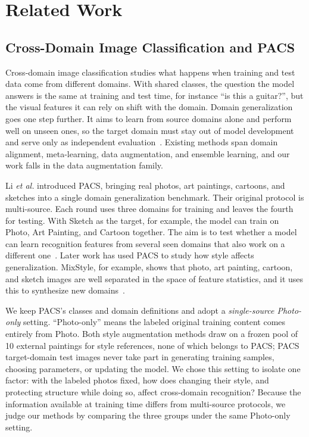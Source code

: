 \documentclass[conference]{IEEEtran}
\begin{document}
\section{Related Work}

\subsection{Cross-Domain Image Classification and PACS}

Cross-domain image classification studies what happens when training and test data come from different domains. With shared classes, the question the model answers is the same at training and test time, for instance ``is this a guitar?'', but the visual features it can rely on shift with the domain. Domain generalization goes one step further. It aims to learn from source domains alone and perform well on unseen ones, so the target domain must stay out of model development and serve only as independent evaluation~\cite{zhou2023dgsurvey}. Existing methods span domain alignment, meta-learning, data augmentation, and ensemble learning, and our work falls in the data augmentation family.

Li \textit{et al.} introduced PACS, bringing real photos, art paintings, cartoons, and sketches into a single domain generalization benchmark. Their original protocol is multi-source. Each round uses three domains for training and leaves the fourth for testing. With Sketch as the target, for example, the model can train on Photo, Art Painting, and Cartoon together. The aim is to test whether a model can learn recognition features from several seen domains that also work on a different one~\cite{li2017dg}. Later work has used PACS to study how style affects generalization. MixStyle, for example, shows that photo, art painting, cartoon, and sketch images are well separated in the space of feature statistics, and it uses this to synthesize new domains~\cite{zhou2021mixstyle}.

We keep PACS's classes and domain definitions and adopt a \textit{single-source Photo-only} setting. ``Photo-only'' means the labeled original training content comes entirely from Photo. Both style augmentation methods draw on a frozen pool of 10 external paintings for style references, none of which belongs to PACS; PACS target-domain test images never take part in generating training samples, choosing parameters, or updating the model. We chose this setting to isolate one factor: with the labeled photos fixed, how does changing their style, and protecting structure while doing so, affect cross-domain recognition? Because the information available at training time differs from multi-source protocols, we judge our methods by comparing the three groups under the same Photo-only setting.
\end{document}
